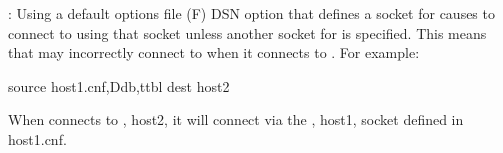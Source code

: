 \documentclass[letterpaper,10pt,english]{sphinxmanual}
\begin{document}
\begin{fulllineitems}
: Using a default options file (F) DSN option that defines a
socket for {\hyperref[\detokenize{mariadb-archiver:cmdoption-mariadb-archiver-source}]{}} causes  to connect to {\hyperref[\detokenize{mariadb-archiver:cmdoption-mariadb-archiver-dest}]{}} using
that socket unless another socket for {\hyperref[\detokenize{mariadb-archiver:cmdoption-mariadb-archiver-dest}]{}} is specified.  This
means that  may incorrectly connect to {\hyperref[\detokenize{mariadb-archiver:cmdoption-mariadb-archiver-source}]{}} when it
connects to {\hyperref[\detokenize{mariadb-archiver:cmdoption-mariadb-archiver-dest}]{}}.  For example:

\begin{sphinxVerbatim}[commandchars=\\\{\}]
\PYGZhy{}\PYGZhy{}source host1.cnf,Ddb,ttbl \PYGZhy{}\PYGZhy{}dest host2
\end{sphinxVerbatim}

When  connects to {\hyperref[\detokenize{mariadb-archiver:cmdoption-mariadb-archiver-dest}]{}}, host2, it will connect via the
{\hyperref[\detokenize{mariadb-archiver:cmdoption-mariadb-archiver-source}]{}}, host1, socket defined in host1.cnf.

\end{fulllineitems}

\end{document}
